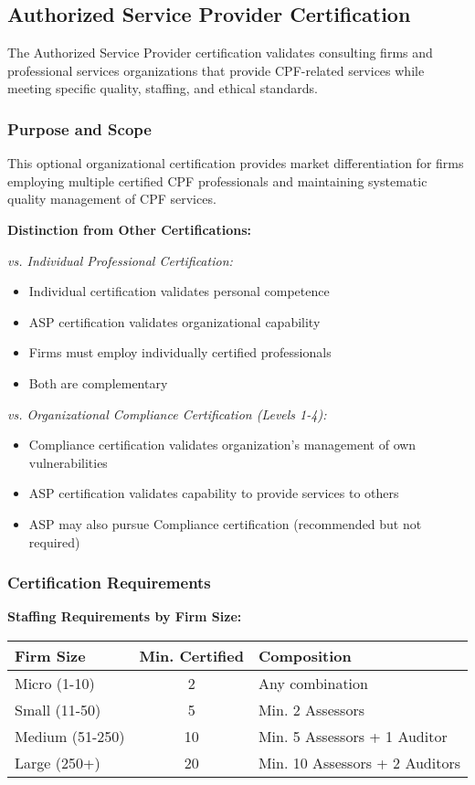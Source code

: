 \documentclass[11pt,a4paper]{article}
\begin{document}
\subsection{Authorized Service Provider Certification}

The Authorized Service Provider certification validates consulting firms and professional services organizations that provide CPF-related services while meeting specific quality, staffing, and ethical standards.

\subsubsection{Purpose and Scope}

This optional organizational certification provides market differentiation for firms employing multiple certified CPF professionals and maintaining systematic quality management of CPF services.

\textbf{Distinction from Other Certifications:}

\textit{vs. Individual Professional Certification:}
\begin{itemize}
\item Individual certification validates personal competence
\item ASP certification validates organizational capability
\item Firms must employ individually certified professionals
\item Both are complementary
\end{itemize}

\textit{vs. Organizational Compliance Certification (Levels 1-4):}
\begin{itemize}
\item Compliance certification validates organization's management of own vulnerabilities
\item ASP certification validates capability to provide services to others
\item ASP may also pursue Compliance certification (recommended but not required)
\end{itemize}

\subsubsection{Certification Requirements}

\textbf{Staffing Requirements by Firm Size:}

\begin{tabular}{|l|c|p{6cm}|}
\hline
\textbf{Firm Size} & \textbf{Min. Certified} & \textbf{Composition} \\
\hline
Micro (1-10) & 2 & Any combination \\
Small (11-50) & 5 & Min. 2 Assessors \\
Medium (51-250) & 10 & Min. 5 Assessors + 1 Auditor \\
Large (250+) & 20 & Min. 10 Assessors + 2 Auditors \\
\hline
\end{tabular}
\end{document}
